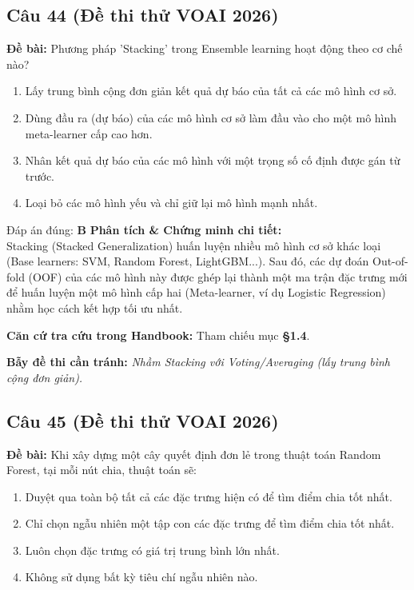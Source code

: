 \documentclass[10pt,a4paper]{article}
\begin{document}
\subsection*{Câu 44 (Đề thi thử VOAI 2026)}
\textbf{Đề bài:} Phương pháp 'Stacking' trong Ensemble learning hoạt động theo cơ chế nào?

\begin{enumerate}[label=\textbf{\Alph*.}]
    \item Lấy trung bình cộng đơn giản kết quả dự báo của tất cả các mô hình cơ sở.
    \item Dùng đầu ra (dự báo) của các mô hình cơ sở làm đầu vào cho một mô hình meta-learner cấp cao hơn.
    \item Nhân kết quả dự báo của các mô hình với một trọng số cố định được gán từ trước.
    \item Loại bỏ các mô hình yếu và chỉ giữ lại mô hình mạnh nhất.
\end{enumerate}

\begin{solbox}{Đáp án đúng: \textbf{B}}
\textbf{Phân tích \& Chứng minh chi tiết:} \\
Stacking (Stacked Generalization) huấn luyện nhiều mô hình cơ sở khác loại (Base learners: SVM, Random Forest, LightGBM...). Sau đó, các dự đoán Out-of-fold (OOF) của các mô hình này được ghép lại thành một ma trận đặc trưng mới để huấn luyện một mô hình cấp hai (Meta-learner, ví dụ Logistic Regression) nhằm học cách kết hợp tối ưu nhất.

\vspace{0.4em}
\textbf{Căn cứ tra cứu trong Handbook:} Tham chiếu mục \textbf{§1.4}.

\vspace{0.4em}
\textbf{Bẫy đề thi cần tránh:} \textit{Nhầm Stacking với Voting/Averaging (lấy trung bình cộng đơn giản).}
\end{solbox}
\vspace{0.5em}


\subsection*{Câu 45 (Đề thi thử VOAI 2026)}
\textbf{Đề bài:} Khi xây dựng một cây quyết định đơn lẻ trong thuật toán Random Forest, tại mỗi nút chia, thuật toán sẽ:

\begin{enumerate}[label=\textbf{\Alph*.}]
    \item Duyệt qua toàn bộ tất cả các đặc trưng hiện có để tìm điểm chia tốt nhất.
    \item Chỉ chọn ngẫu nhiên một tập con các đặc trưng để tìm điểm chia tốt nhất.
    \item Luôn chọn đặc trưng có giá trị trung bình lớn nhất.
    \item Không sử dụng bất kỳ tiêu chí ngẫu nhiên nào.
\end{enumerate}
\end{document}
